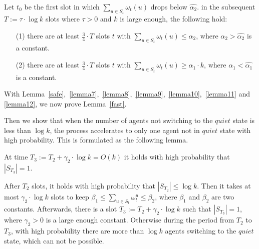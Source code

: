 \begin{lemma}
    \label{lemma12}
    Let $t_0$ be the first slot in which ${\sum}_{u\in S_t}\omega_t(u)$
    drops below $\hat{\alpha_2}$. in the subsequent $T :=\tau\cdot\log k$ slots
    where $\tau > 0$ and $k$ is large enough, the following hold:
    \begin{itemize}
        \item[(1)] there are at least $\frac{3}{4}\cdot T$ slots $t$
        with ${\sum}_{u\in S_t}\omega_t(u) \leq \alpha_2$, where $\alpha_2 > \hat{\alpha_2}$
        is a constant.
        \item[(2)] there are at least $\frac{3}{4}\cdot T$ slots $t$
        with ${\sum}_{u\in S_t}\omega_t(u) \geq \alpha_1\cdot k$, where $\alpha_1 < \hat{\alpha_1}$
        is a constant.
    \end{itemize}
\end{lemma}


With Lemma~\ref{safe},~\ref{lemma7},~\ref{lemma8},~\ref{lemma9},~\ref{lemma10},~\ref{lemma11} and
\ref{lemma12}, we now prove Lemma~\ref{fast}.


Then we show that when the number of agents not switching to 
the $quiet$ state is less than $\log k$, the process accelerates to 
only one agent not in $quiet$ state with high probability.
This is formulated as the following lemma.

\begin{lemma}
    \label{slow}
    At time $T_3 :=T_2 +\gamma_2 \cdot \log k = O(k)$ it holds with high
    probability that $|S_{T_3}| = 1$.
\end{lemma}
\begin{IEEEproof}
    After $T_2$ slots, it holds with high probability 
    that $|S_{T_2}| \leq \log k$. Then it takes at most $\gamma_2 \cdot \log k$
    slots to keep $\beta_1 \leq \sum_{u\in S_t} \omega_t^u \leq \beta_2$,
    where $\beta_1$ and $\beta_2$ are two constants.
    Afterwards, there is a slot $T_3 :=T_2 +\gamma_2\cdot\log k$ such that
    $|S_{T_3}| = 1$, where $\gamma_2 > 0$ is a large enough constant. 
    Otherwise during the period from $T_2$ to $T_3$,
    with high probability there are 
    more than $\log k$ agents switching to
    the $quiet$ state, which can not be possible.
\end{IEEEproof}

